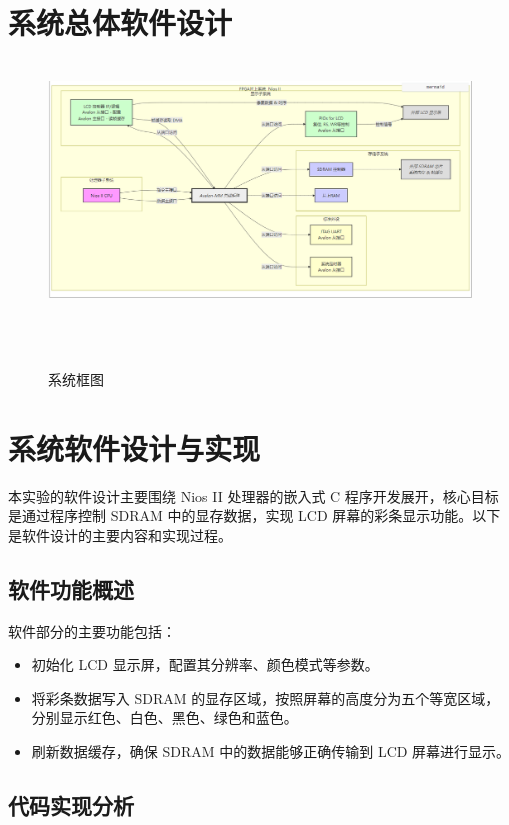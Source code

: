 \documentclass[12pt,hyperref,a4paper,UTF8]{ctexart}
\begin{document}
\section{系统总体软件设计}


\begin{figure}[H] %
        \centering
        \includegraphics[width=1\textwidth]{figures/002.png} %
        \caption{系统框图} %
        \label{fig:example} %
\end{figure}

\section{系统软件设计与实现}

本实验的软件设计主要围绕 Nios II 处理器的嵌入式 C 程序开发展开，核心目标是通过程序控制 SDRAM 中的显存数据，实现 LCD 屏幕的彩条显示功能。以下是软件设计的主要内容和实现过程。

\subsection{软件功能概述}

软件部分的主要功能包括：
\begin{itemize}
    \item 初始化 LCD 显示屏，配置其分辨率、颜色模式等参数。
    \item 将彩条数据写入 SDRAM 的显存区域，按照屏幕的高度分为五个等宽区域，分别显示红色、白色、黑色、绿色和蓝色。
    \item 刷新数据缓存，确保 SDRAM 中的数据能够正确传输到 LCD 屏幕进行显示。
\end{itemize}

\subsection{代码实现分析}
\end{document}
